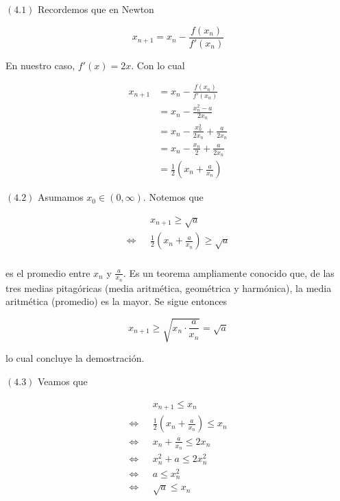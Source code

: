 \documentclass[12pt]{article}
\begin{document}
$(4.1)$ Recordemos que en Newton 

\begin{equation*}
    x_{n+1} = x_n - \frac{f(x_n)}{f'(x_n)}
\end{equation*}

En nuestro caso, $f'(x) = 2x$. Con lo cual 

\begin{align*}
    x_{n+1} 
    &=  x_n - \frac{ f(x_n) }{f'(x_n)} \\ 
    &= x_n - \frac{x_n^2 - a}{2x_n} \\ 
    &= x_n - \frac{x_n^2}{2x_n} + \frac{a}{2x_n} \\ 
    &= x_n - \frac{x_n}{2} + \frac{a}{2x_n} \\ 
    &= \frac{1}{2}\left( x_n + \frac{a}{x_n} \right) 
\end{align*}

$(4.2)$ Asumamos $x_0 \in (0, \infty)$. Notemos que 

\begin{align*}
    &x_{n+1} \geq \sqrt{a}  \\ 
    \iff ~ ~ ~ 
    &\frac{1}{2}\left( x_n + \frac{a}{x_n} \right) \geq \sqrt{a} \\ 
\end{align*}

es el promedio entre $x_n$ y $\frac{a}{x_n}$. Es un teorema ampliamente conocido
que, de las tres medias pitagóricas (media aritmética, geométrica y harmónica),
la media aritmética (promedio) es la mayor. Se sigue entonces 

\begin{equation*}
    x_{n+1} \geq \sqrt{x_n \cdot \frac{a}{x_n}} = \sqrt{a} 
\end{equation*}

lo cual concluye la demostración.

$(4.3)$ Veamos que 

\begin{align*}
    &x_{n+1} \leq x_n \\ 
    \iff ~ ~ ~ 
    &\frac{1}{2}\left( x_n + \frac{a}{x_n} \right)  \leq x_n \\ 
    \iff ~ ~ ~ 
    &x_n + \frac{a}{x_n} \leq 2x_n \\ 
    \iff ~ ~ ~ 
    &x_n^2 + a \leq 2x_n^2 \\ 
    \iff ~ ~ ~ 
    &a \leq x_n^2 \\ 
    \iff ~ ~ ~ 
    &\sqrt{a}  \leq x_n
\end{align*}
\end{document}
